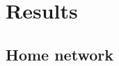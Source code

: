 \documentclass{sig-alternate-05-2015}
\begin{document}
\section{Results}\label{sec:results}
\subsection{Home network}
\end{document}
